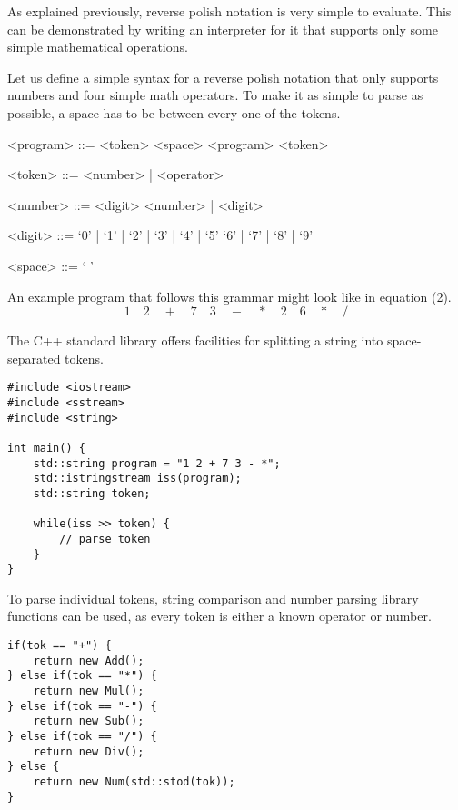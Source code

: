 \documentclass[a4paper,twocolumn]{article}
\begin{document}
As explained previously, reverse polish notation is very simple to evaluate. This can be demonstrated by writing an interpreter for it that supports only some simple mathematical operations.

Let us define a simple syntax for a reverse polish notation that only supports numbers and four simple math operators. To make it as simple to parse as possible, a space has to be between every one of the tokens.

\setlength{\grammarindent}{4em}
\begin{grammar}

<program> ::= <token> <space> <program>
              \alt <token>

<token> ::= <number> | <operator>

<number> ::= <digit> <number> | <digit>

<digit> ::= ‘0’ | ‘1’ | ‘2’ | ‘3’ | ‘4’ | ‘5’
\alt ‘6’ | ‘7’ | ‘8’ | ‘9’

<space> ::= ‘ ’ 

\end{grammar}

An example program that follows this grammar might look like in equation (2).
\begin{equation}
1\quad2\quad+\quad7\quad3\quad-\quad*\quad2\quad6\quad*\quad/  
\end{equation}

The C++ standard library offers facilities for splitting a string into space-separated tokens.

\begin{verbatim}
#include <iostream>
#include <sstream>
#include <string>

int main() {
    std::string program = "1 2 + 7 3 - *";
    std::istringstream iss(program);
    std::string token;

    while(iss >> token) {
        // parse token
    }
}  
\end{verbatim}

To parse individual tokens, string comparison and number parsing library functions can be used, as every token is either a known operator or number.

\begin{verbatim}
if(tok == "+") {
    return new Add();
} else if(tok == "*") {
    return new Mul();
} else if(tok == "-") {
    return new Sub();
} else if(tok == "/") {
    return new Div();
} else {
    return new Num(std::stod(tok));
}
\end{verbatim}
\end{document}
